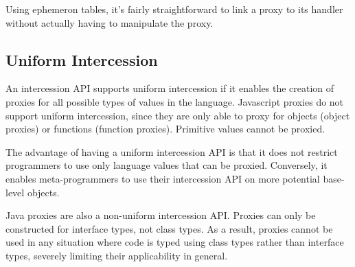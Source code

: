 \documentclass{acm_proc_article-sp}
\begin{document}

Using ephemeron tables, it's fairly straightforward to link a proxy to its handler without actually having to manipulate the proxy.

\subsection{Uniform Intercession}
\label{sub:uniform_intercession}

An intercession API supports uniform intercession if it enables the creation of proxies for all possible types of values in the language. Javascript proxies do not support uniform intercession, since they are only able to proxy for objects (object proxies) or functions (function proxies). Primitive values cannot be proxied.

The advantage of having a uniform intercession API is that it does not restrict programmers to use only language values that can be proxied. Conversely, it enables meta-programmers to use their intercession API on more potential base-level objects.

Java proxies are also a non-uniform intercession API. Proxies can only be constructed for interface types, not class types. As a result, proxies cannot be used in any situation where code is typed using class types rather than interface types, severely limiting their applicability in general.

\end{document}
